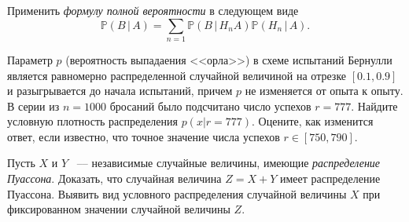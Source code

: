 \begin{ordre}
Применить \textit{формулу полной вероятности} в следующем виде 
$$
{\mathbb P}(B\, |\, A)=\sum\limits_{n=1} {\mathbb P}(B\, |\, H_n A){\mathbb P}(H_n\, |\, A).
$$
\end{ordre}


\begin{problem}
Параметр $p$ (вероятность выпадаения <<орла>>) в схеме испытаний Бернулли является равномерно распределенной случайной величиной на отрезке $[0.1, 0.9]$ и разыгрывается до начала испытаний, причем $p$ не изменяется от опыта к опыту. В серии из $n=1000$ бросаний было подсчитано число успехов $r=777$.  Найдите условную плотность распределения $p(x|r=777)$. Оцените, как изменится ответ, если известно, что точное значение числа успехов $r\in[750, 790]$.
\end{problem}


\begin{comment}
\begin{problem}
\begin{enumerate}
\item Имеется монетка (несимметричная). Несимметричность монетки заключается в том, что либо орел выпадает в два раза чаще решки; 
либо наоборот (априорно (до проведения опытов) оба варианта считаются равновероятными). Монетку бросили $10$ раз. Орел выпал $7$ раз. 
Определите апостериорную вероятность того, что орел выпадает в два раза чаще решки (апостериорная вероятность считается с учетом 
проведенных опытов (иначе говоря, это просто условная вероятность)). 

\item Определите апостериорную вероятность того, что орел выпадает не менее чем в два раза чаще решки. Если несимметричность 
монетки заключается в том, что либо орел выпадает не менее чем в два раза чаще решки; либо наоборот (априорно оба варианта считаются 
равновероятными). 
\end{enumerate}
\end{problem}
\end{comment}

\begin{problem}
Пусть $X$ и $Y$ ~--– независимые случайные величины,  имеющие \textit{распределение Пуассона}. 
Доказать, что случайная величина $Z = X + Y$ имеет распределение Пуассона. 
Выявить вид условного распределения случайной величины $X$ при фиксированном значении случайной величины $Z$.
\end{problem}
